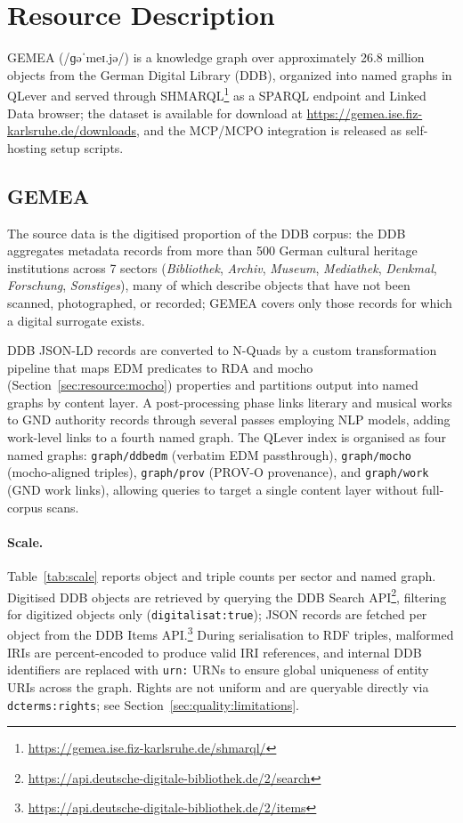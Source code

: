 
\section{Resource Description}
\label{sec:resource}

GEMEA (/ɡəˈmeɪ.jə/) is a knowledge graph over approximately 26.8 million objects from the German Digital Library (DDB), organized into named graphs in QLever and served through SHMARQL\footnote{\url{https://gemea.ise.fiz-karlsruhe.de/shmarql/}} as a SPARQL endpoint and Linked Data browser; the dataset is available for download at \url{https://gemea.ise.fiz-karlsruhe.de/downloads}, and the MCP/MCPO integration is released as self-hosting setup scripts.

\subsection{GEMEA}
\label{sec:resource:kg}

The source data is the digitised proportion of the DDB corpus: the DDB aggregates metadata records from more than 500 German cultural heritage institutions across 7 sectors (\textit{Bibliothek}, \textit{Archiv}, \textit{Museum}, \textit{Mediathek}, \textit{Denkmal}, \textit{Forschung}, \textit{Sonstiges}), many of which describe objects that have not been scanned, photographed, or recorded; GEMEA covers only those records for which a digital surrogate exists.

DDB JSON-LD records are converted to N-Quads by a custom transformation pipeline that maps EDM predicates to RDA and mocho (Section~\ref{sec:resource:mocho}) properties and partitions output into named graphs by content layer.
A post-processing phase links literary and musical works to GND authority records through several passes employing NLP models, adding work-level links to a fourth named graph.
The QLever index is organised as four named graphs: \texttt{graph/ddbedm} (verbatim EDM passthrough), \texttt{graph/mocho} (mocho-aligned triples), \texttt{graph/prov} (PROV-O provenance), and \texttt{graph/work} (GND work links), allowing queries to target a single content layer without full-corpus scans.

\paragraph{Scale.}
Table~\ref{tab:scale} reports object and triple counts per sector and named graph.
Digitised DDB objects are retrieved by querying the DDB Search API\footnote{\url{https://api.deutsche-digitale-bibliothek.de/2/search}}, filtering for digitized objects only (\texttt{digitalisat:true}); JSON records are fetched per object from the DDB Items API.\footnote{\url{https://api.deutsche-digitale-bibliothek.de/2/items}}
During serialisation to RDF triples, malformed IRIs are percent-encoded to produce valid IRI references, and internal DDB identifiers are replaced with \texttt{urn:} URNs to ensure global uniqueness of entity URIs across the graph.
Rights are not uniform and are queryable directly via \texttt{dcterms:rights}; see Section~\ref{sec:quality:limitations}.

